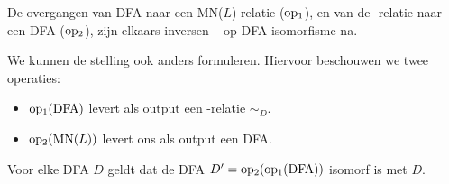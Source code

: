 \documentclass[../aanvullingen_cursus.tex]{subfiles}
\begin{document}
\begin{stelling}
	De overgangen van DFA naar een MN(\(L\))-relatie (\(\operatorname{op_1}\)), en van de \mnl-relatie naar een DFA (\(\operatorname{op_2}\)), zijn elkaars inversen -- op DFA-isomorfisme na.
\end{stelling}

We kunnen de stelling ook anders formuleren. Hiervoor beschouwen we twee operaties:
\begin{itemize}
	\item \(\operatorname{op_1}(\text{DFA})\) levert als output een \mnl-relatie \(\sim_D\).
	\item \(\operatorname{op_2}(\text{MN}(L))\) levert ons als output een DFA.
\end{itemize}

\begin{stelling}
	Voor elke DFA \(D\) geldt dat de DFA \(D'=\operatorname{op_2}(\operatorname{op_1}(\text{DFA}))\) isomorf is met \(D\).
\end{stelling}
\end{document}
